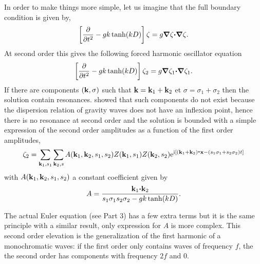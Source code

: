 In order to make things more simple, let us imagine that the full boundary condition is given by, 
\begin{equation}
\left[ \frac{\partial }{\partial t^2} - g k \tanh(kD) \right]\zeta  = g \mbox{\boldmath $\nabla$} \zeta \mbox{\boldmath $\cdot$} \mbox{\boldmath $\nabla$} \zeta.
\end{equation}
At second order this gives the following forced harmonic oscillator equation 
\begin{equation}
\left[ \frac{\partial }{\partial t^2} - g k \tanh(kD) \right]\zeta_2  = g \mbox{\boldmath $\nabla$} \zeta_1 \mbox{\boldmath $\cdot$} \mbox{\boldmath $\nabla$} \zeta_1.
\end{equation}
If there are components $(\mathbf{k},\sigma)$ such that $\mathbf{k}=\mathbf{k}_1+\mathbf{k}_2$ et $\sigma=\sigma_1+\sigma_2$ then the solution contain resonances. \cite{Phillips1960} showed
that such components do not exist because the dispersion relation of gravity waves does not have an inflexion point, hence there is no resonance at second order 
and the solution is bounded with a simple expression of the second order amplitudes as a function of the first order amplitudes, 
\begin{equation}
 \zeta_2=\sum_{\mathbf{k}_1,s_1} \sum_{\mathbf{k}_2,s} A (\mathbf{k}_1,\mathbf{k}_2,s_1,s_2) Z(\mathbf{k}_1,s_1)  Z(\mathbf{k}_2,s_2)  
\mathrm{e}^{\mathrm{i} \left[(\mathbf{k}_1 + \mathbf{k}_2) \mbox{\boldmath $\cdot$} \mathbf{x} -(s_1 \sigma_1+s_2 \sigma_2) t\right]} \label{zeta2}
\end{equation}
with $A (\mathbf{k}_1,\mathbf{k}_2,s_1,s_2)$ a constant coefficient given by
\begin{equation}
 A=\frac{\mathbf{k}_1 \mbox{\boldmath $\cdot$} \mathbf{k}_2 }{s_1 \sigma_1 s_2 \sigma_2 - g k \tanh(kD)}\label{eq:nl_A_simple}.
\end{equation}

The actual Euler equation (see Part 3) has a few extra terms but it is the same principle with a similar result, only expression for  $A$ is more complex. 
This second order elevation is the generalization of the first harmonic of a monochromatic waves: if the first order only contains waves of frequency $f$, 
the the second order has components with frequency $2f$ and 0. 

